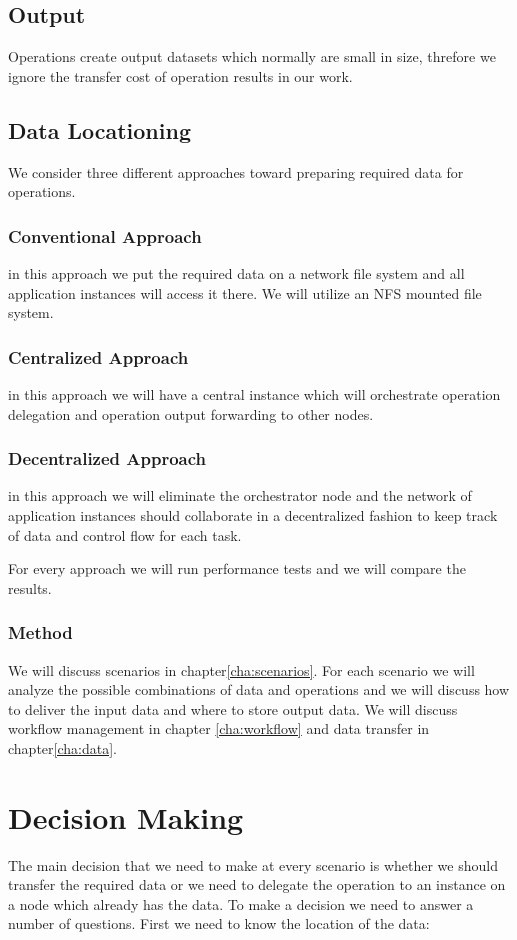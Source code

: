 \subsection{Output}
Operations create output datasets which normally are small in size, threfore we ignore the transfer cost of operation
results in our work.

\subsection{Data Locationing}
We consider three different approaches toward preparing required data for operations.
\subsubsection{Conventional Approach}
in this approach we put the required data on a network file system and all
application instances will access it there. We will utilize an NFS mounted file system.
\subsubsection{Centralized Approach}
in this approach we will have a central instance which will orchestrate operation
delegation and operation output forwarding to other nodes.
\subsubsection{Decentralized Approach}
in this approach we will eliminate the orchestrator node and the network of
application instances should collaborate in a decentralized fashion to keep track of data and control flow for each
task.

For every approach we will run performance tests and we will compare the results.

\subsubsection{Method}
We will discuss scenarios in chapter\ref{cha:scenarios}. For each scenario we will analyze the possible combinations 
of data and operations and we will discuss how to 
deliver the input data and where to store output data. We will discuss workflow management in chapter 
\ref{cha:workflow} and data transfer in chapter\ref{cha:data}.


\section{Decision Making}
The main decision that we need to make at every scenario is whether we should transfer the required data or we
need to delegate the operation to an instance on a node which already has the data. To make a decision we need to
answer a number of questions. First we need to know the location of the data:

